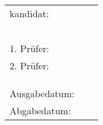 \begin{titlepage}
{\begin{center}
	\renewcommand*{\arraystretch}{1} 
	{\makeatletter
		\begin{tabular}{lll}
			\type kandidat: & \verfasserB \\
							& \strasseB \\
							& \wohnortB \\ \\ \\ \\
	
			1. Prüfer: & \prueferA \\
			2. Prüfer: & \prueferB \\ \\ \\ \\
			
			Ausgabedatum: & \ausgabedatum \\
			Abgabedatum: & \abgabedatum
		\end{tabular}
		\makeatother}
	
	\endgroup
\end{center}
}

\end{titlepage}



